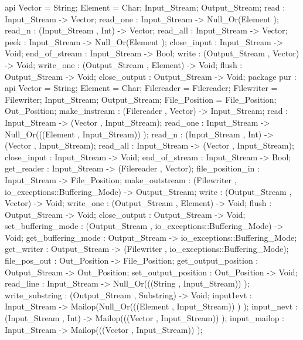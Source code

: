 api {
    Vector  = String;
    Element  = Char;
    Input_Stream;
    Output_Stream;
    read : Input_Stream -> Vector;
    read_one : Input_Stream -> Null_Or(Element );
    read_n : (Input_Stream , Int) -> Vector;
    read_all : Input_Stream -> Vector;
    peek : Input_Stream -> Null_Or(Element );
    close_input : Input_Stream -> Void;
    end_of_stream : Input_Stream -> Bool;
    write : (Output_Stream , Vector) -> Void;
    write_one : (Output_Stream , Element) -> Void;
    flush : Output_Stream -> Void;
    close_output : Output_Stream -> Void;
        package pur
          : api {
                Vector  = String;
                Element  = Char;
                Filereader  = Filereader;
                Filewriter  = Filewriter;
                Input_Stream;
                Output_Stream;
                File_Position  = File_Position;
                Out_Position;
                make_instream : (Filereader , Vector) -> Input_Stream;
                read : Input_Stream -> (Vector , Input_Stream);
                read_one : Input_Stream -> Null_Or(((Element , Input_Stream)) );
                read_n : (Input_Stream , Int) -> (Vector , Input_Stream);
                read_all : Input_Stream -> (Vector , Input_Stream);
                close_input : Input_Stream -> Void;
                end_of_stream : Input_Stream -> Bool;
                get_reader : Input_Stream -> (Filereader , Vector);
                file_position_in : Input_Stream -> File_Position;
                make_outstream : (Filewriter , io_exceptions::Buffering_Mode) -> Output_Stream;
                write : (Output_Stream , Vector) -> Void;
                write_one : (Output_Stream , Element) -> Void;
                flush : Output_Stream -> Void;
                close_output : Output_Stream -> Void;
                set_buffering_mode : (Output_Stream , io_exceptions::Buffering_Mode) -> Void;
                get_buffering_mode : Output_Stream -> io_exceptions::Buffering_Mode;
                get_writer : Output_Stream -> (Filewriter , io_exceptions::Buffering_Mode);
                file_pos_out : Out_Position -> File_Position;
                get_output_position : Output_Stream -> Out_Position;
                set_output_position : Out_Position -> Void;
                read_line : Input_Stream -> Null_Or(((String , Input_Stream)) );
                write_substring : (Output_Stream , Substring) -> Void;
                input1evt : Input_Stream -> Mailop(Null_Or(((Element , Input_Stream)) ) );
                input_nevt : (Input_Stream , Int) -> Mailop(((Vector , Input_Stream)) );
                input_mailop : Input_Stream -> Mailop(((Vector , Input_Stream)) );
}}
